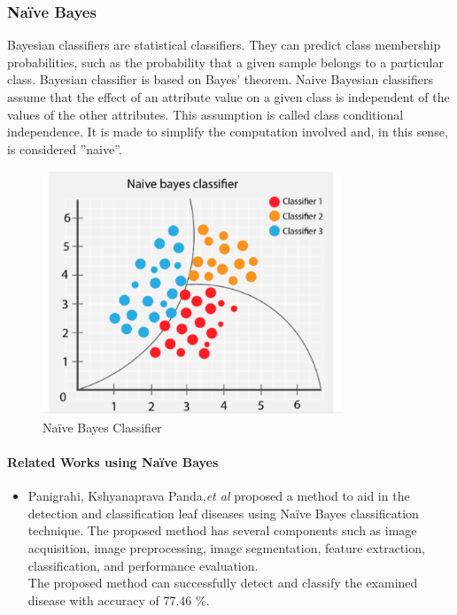 \subsubsection{Naïve Bayes}
Bayesian classifiers are statistical classifiers. They can predict class membership probabilities, such as the probability that a given sample belongs to a particular class. Bayesian classifier is based on Bayes’ theorem. Naive Bayesian classifiers assume that the effect of an attribute value on a given class is independent of the values of the other attributes. This assumption is called class conditional independence. It is made to simplify the computation involved and, in this sense, is considered ”naive”. \cite{art17}
\begin{figure}[!h]
    \centering
    \includegraphics[width=0.8\textwidth]{chapters/chapter02/fig02/nb.png}
    \caption{Naïve Bayes Classifier}
    \label{fig:my_label}
\end{figure}
\paragraph{Related Works using Naïve Bayes}
\begin{itemize}
   \item Panigrahi, Kshyanaprava Panda,\textit{et al} \cite{art19} proposed a method to aid in the detection and classification leaf diseases using Naïve Bayes classification technique.
    The proposed method has several components such as image acquisition, image preprocessing, image segmentation, feature extraction, classification, and performance evaluation. \vspace{4mm}\\
    The proposed method can successfully detect and classify the examined disease with accuracy of 77.46 \%.

\end{itemize}


